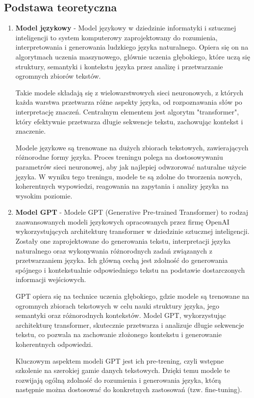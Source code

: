 \subsection{Podstawa teoretyczna}
\begin{enumerate}
    
    \item {\bf Model językowy} - Model językowy w dziedzinie informatyki i sztucznej inteligencji to system komputerowy zaprojektowany do rozumienia, interpretowania i generowania ludzkiego języka naturalnego. Opiera się on na algorytmach uczenia maszynowego, głównie uczenia głębokiego, które uczą się struktury, semantyki i kontekstu języka przez analizę i przetwarzanie ogromnych zbiorów tekstów.

    Takie modele składają się z wielowarstwowych sieci neuronowych, z których każda warstwa przetwarza różne aspekty języka, od rozpoznawania słów po interpretację znaczeń. Centralnym elementem jest algorytm "transformer", który efektywnie przetwarza długie sekwencje tekstu, zachowując kontekst i znaczenie.
    
    Modele językowe są trenowane na dużych zbiorach tekstowych, zawierających różnorodne formy języka. Proces treningu polega na dostosowywaniu parametrów sieci neuronowej, aby jak najlepiej odwzorować naturalne użycie języka. W wyniku tego treningu, modele te są zdolne do tworzenia nowych, koherentnych wypowiedzi, reagowania na zapytania i analizy języka na wysokim poziomie.
    \\
    \item {\bf Model GPT} - Modele GPT (Generative Pre-trained Transformer) to rodzaj zaawansowanych modeli językowych opracowanych przez firmę OpenAI wykorzystujących architekturę transformer w dziedzinie sztucznej inteligencji. Zostały one zaprojektowane do generowania tekstu, interpretacji języka naturalnego oraz wykonywania różnorodnych zadań związanych z przetwarzaniem języka. Ich główną cechą jest zdolność do generowania spójnego i kontekstualnie odpowiedniego tekstu na podstawie dostarczonych informacji wejściowych.

    GPT opiera się na technice uczenia głębokiego, gdzie modele są trenowane na ogromnych zbiorach tekstowych w celu nauki struktury języka, jego semantyki oraz różnorodnych kontekstów. Model GPT, wykorzystując architekturę transformer, skutecznie przetwarza i analizuje długie sekwencje tekstu, co pozwala na zachowanie złożonego kontekstu i generowanie koherentnych odpowiedzi.
    
    Kluczowym aspektem modeli GPT jest ich pre-trening, czyli wstępne szkolenie na szerokiej gamie danych tekstowych. Dzięki temu modele te rozwijają ogólną zdolność do rozumienia i generowania języka, którą następnie można dostosować do konkretnych zastosowań (tzw. fine-tuning).
    

\end{enumerate}
